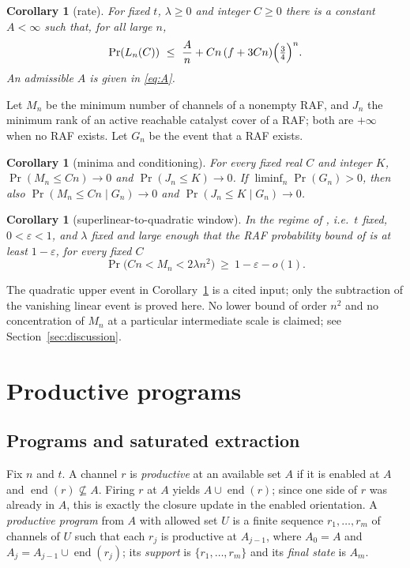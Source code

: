 \documentclass[11pt,a4paper]{article}
\theoremstyle{plain}
\newtheorem{corollary}[theorem]{Corollary}
\theoremstyle{definition}
\theoremstyle{remark}
\newcommand{\eend}{\operatorname{end}}
\begin{document}
\begin{corollary}[rate]\label{cor:rate}
For fixed $t$, $\lambda\ge0$ and integer $C\ge0$ there is a constant $A<\infty$ such that, for all large $n$,
\begin{equation}\label{eq:rate}
\Pr(L_n(C))\ \le\ \frac{A}{n}+Cn\,(f+3Cn)\Bigl(\tfrac34\Bigr)^n .
\end{equation}
An admissible $A$ is given in \eqref{eq:A}.
\end{corollary}

Let $M_n$ be the minimum number of channels of a nonempty RAF, and $J_n$ the minimum rank of an active reachable catalyst cover of a RAF; both are $+\infty$ when no RAF exists. Let $G_n$ be the event that a RAF exists.

\begin{corollary}[minima and conditioning]\label{cor:minima}
For every fixed real $C$ and integer $K$, $\Pr(M_n\le Cn)\to0$ and $\Pr(J_n\le K)\to0$. If $\liminf_n\Pr(G_n)>0$, then also $\Pr(M_n\le Cn\mid G_n)\to0$ and $\Pr(J_n\le K\mid G_n)\to0$.
\end{corollary}

\begin{corollary}[superlinear-to-quadratic window]\label{cor:window}
In the regime of \cite[Corollary~2]{hordijk2016variable}, i.e.\ $t$ fixed, $0<\varepsilon<1$, and $\lambda$ fixed and large enough that the RAF probability bound of \cite[Theorem~1]{hordijk2016variable} is at least $1-\varepsilon$, for every fixed $C$
\[
\Pr\bigl(Cn<M_n<2\lambda n^2\bigr)\ \ge\ 1-\varepsilon-o(1).
\]
\end{corollary}

The quadratic upper event in Corollary~\ref{cor:window} is a cited input; only the subtraction of the vanishing linear event is proved here. No lower bound of order $n^2$ and no concentration of $M_n$ at a particular intermediate scale is claimed; see Section~\ref{sec:discussion}.

\section{Productive programs}\label{sec:programs}

\subsection{Programs and saturated extraction}

Fix $n$ and $t$. A channel $r$ is \emph{productive} at an available set $A$ if it is enabled at $A$ and $\eend(r)\not\subseteq A$. Firing $r$ at $A$ yields $A\cup\eend(r)$; since one side of $r$ was already in $A$, this is exactly the closure update in the enabled orientation. A \emph{productive program} from $A$ with allowed set $U$ is a finite sequence $r_1,\dots,r_m$ of channels of $U$ such that each $r_j$ is productive at $A_{j-1}$, where $A_0=A$ and $A_j=A_{j-1}\cup\eend(r_j)$; its \emph{support} is $\{r_1,\dots,r_m\}$ and its \emph{final state} is $A_m$.
\end{document}
